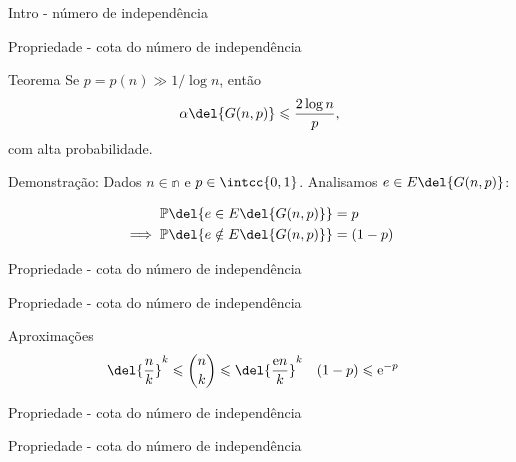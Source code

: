 \documentclass{beamer}
\begin{document}
    \begin{frame}{Intro - número de independência}

    \end{frame}

    \begin{frame}{Propriedade - cota do número de independência}
        \begin{block}{Teorema}
            Se $p=p(n)\gg 1/\log n$, então
            \[ \alpha\del{G(n,p)}\leqslant \dfrac{2\log n}{p}, \]
            com alta probabilidade.
        \end{block} \pause

        \begin{block}{Demonstração:}
            Dados $n\in\mathbb{n}$ e $p\in\intcc{0,1}$.
            Analisamos $e\in E\del{G(n,p)}$:

            \begin{align*}
                \mathbb{P}\del{e\in E\del{G(n,p)}} &= p\\
                \implies \mathbb{P}\del{e\notin E\del{G(n,p)}} &= (1-p)
            \end{align*}
        \end{block}
    \end{frame}

    \begin{frame}{Propriedade - cota do número de independência}
    \end{frame}

    \begin{frame}{Propriedade - cota do número de independência}
        \vspace{-1cm}
        \begin{block}{Aproximações}
            \begin{align*}
                \del{\dfrac{n}{k}}^k\leqslant\binom{n}{k}&\leqslant
                \del{\dfrac{\mathrm{e}n}{k}}^k & (1-p)&\leqslant\mathrm{e}^{-p}
            \end{align*}
        \end{block} \vspace{\stretch3}

    \end{frame}

    \begin{frame}{Propriedade - cota do número de independência}
    \end{frame}

    \begin{frame}{Propriedade - cota do número de independência}
    \end{frame}
\end{document}
